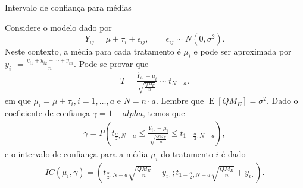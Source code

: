 \documentclass[8pt]{beamer}
\DeclareMathOperator{\espe}{E}
\begin{document}
\begin{frame}{Intervalo de confiança para médias}

Considere o modelo dado por
$$Y_{ij} = \mu + \tau_i  + \epsilon_{ij}, \qquad \epsilon_{ij} \sim N(0, \sigma^2).$$
Neste contexto, a média para cada tratamento é $\mu_i$ e pode ser aproximada por $\bar{y}_{i\cdot} = \frac{y_{i1} + y_{i2} + \cdots + y_{in}}{n} $. Pode-se provar que
\begin{align*}
	T = \frac{\bar{Y}_{i\cdot} - \mu_i}{\sqrt{\frac{QM_E}{n}}} \sim  t_{N - a}.
\end{align*}
em que $\mu_i=\mu+\tau_i,i =1, \dots, a$ e $N = n \cdot a$. Lembre que $\espe\left[QM_E\right] = \sigma^2$. Dado o coeficiente de confiança $\gamma=1-alpha$, temos que
\begin{align*}
\gamma = P\left( t_{\frac{\alpha}{2};N - a} \leq \frac{\bar{Y}_{i\cdot} - \mu_i}{\sqrt{\frac{QM_E}{n}}} \leq t_{1-\frac{\alpha}{2};N - a}  \right),
\end{align*}
e o intervalo de confiança para a média $\mu_i$ do tratamento  $i$ é dado
\begin{align*}
IC(\mu_i, \gamma) = \left( t_{\frac{\alpha}{2};N - a} \sqrt{\frac{QM_E}{n}} + \bar{y}_{i\cdot}; t_{1-\frac{\alpha}{2};N - a} \sqrt{\frac{QM_E}{n}} + \bar{y}_{i\cdot} \right).
\end{align*}
\end{frame}
\end{document}
